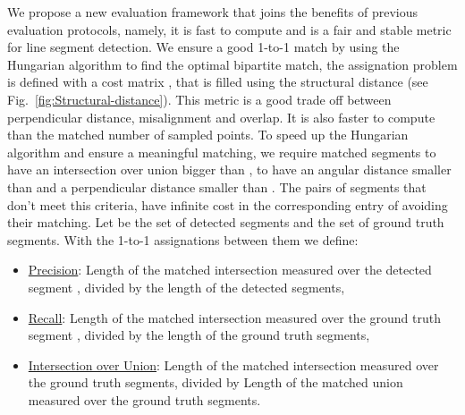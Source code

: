 \documentclass[preprint,12pt]{elsarticle}
\begin{document}
We propose a new evaluation framework that joins the benefits of previous evaluation protocols, namely, it is fast to compute and is a fair and stable metric for line segment detection.
We ensure a good 1-to-1 match by using the Hungarian algorithm to find the optimal bipartite match, the assignation problem is defined with a cost matrix , that is filled using the structural distance (see Fig.~\ref{fig:Structural-distance}). This metric is a good trade off between perpendicular distance, misalignment and overlap. It is also faster to compute than the matched number of sampled points.
To speed up the Hungarian algorithm and ensure a meaningful matching, we require matched segments to 
have an intersection over union bigger than , to have an angular distance smaller than  and a perpendicular distance smaller than . The pairs of segments that don't meet this criteria, have infinite cost in the corresponding entry of  avoiding their matching. Let  be the set of detected segments and  the set of ground truth segments. With the 1-to-1 assignations  between them we define:
\begin{itemize}
    \item \underline{Precision}: Length of the matched intersection measured over the detected segment , divided by the length of the detected segments, 
    \item \underline{Recall}: Length of the matched intersection measured over the ground truth segment , divided by the length of the ground truth segments,
    
    \item \underline{Intersection over Union}: Length of the matched intersection measured over the ground truth segments, divided by Length of the matched union measured over the ground truth segments.
    
\end{itemize}
\end{document}
